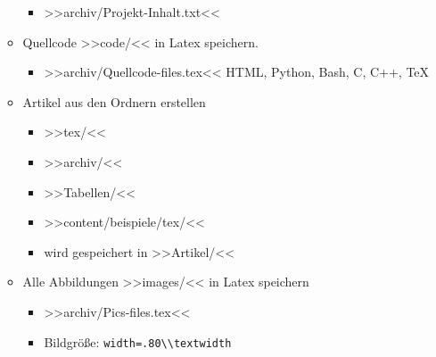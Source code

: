 \begin{enumerate}
\begin{itemize}
    \begin{itemize}
    \item
      >>archiv/Projekt-Inhalt.txt<<
    \end{itemize}
  \item
    Quellcode >>code/<< in Latex speichern.

    \begin{itemize}
    \item
      >>archiv/Quellcode-files.tex<< HTML, Python, Bash, C, C++, TeX
    \end{itemize}
  \item
    Artikel aus den Ordnern erstellen

    \begin{itemize}
    \item
      >>tex/<<
    \item
      >>archiv/<<
    \item
      >>Tabellen/<<
    \item
      >>content/beispiele/tex/<<
    \item
      wird gespeichert in >>Artikel/<<
    \end{itemize}
  \item
    Alle Abbildungen >>images/<< in Latex speichern

    \begin{itemize}
    \item
      >>archiv/Pics-files.tex<<
    \item
      Bildgröße: \verb|width=.80\\textwidth|
    \end{itemize}
  \end{itemize}
\end{enumerate}

